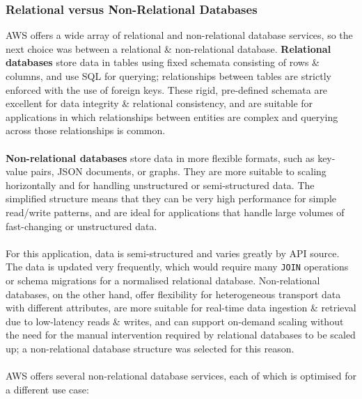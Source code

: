 \documentclass[a4paper,11pt]{report}
\begin{document}
\subsubsection{Relational versus Non-Relational Databases}
AWS offers a wide array of relational and non-relational database services, so the next choice was between a relational \& non-relational database.
\textbf{Relational databases} store data in tables using fixed schemata consisting of rows \& columns, and use SQL for querying;
relationships between tables are strictly enforced with the use of foreign keys.
These rigid, pre-defined schemata are excellent for data integrity \& relational consistency, and are suitable for applications in which relationships between entities are complex and querying across those relationships is common.
\\\\
\textbf{Non-relational databases} store data in more flexible formats, such as key-value pairs, JSON documents, or graphs.
They are more suitable to scaling horizontally and for handling unstructured or semi-structured data.
The simplified structure means that they can be very high performance for simple read/write patterns, and are ideal for applications that handle large volumes of fast-changing or unstructured data.
\\\\
For this application, data is semi-structured and varies greatly by API source.
The data is updated very frequently, which would require many \texttt{JOIN} operations or schema migrations for a normalised relational database.
Non-relational databases, on the other hand, offer flexibility for heterogeneous transport data with different attributes, are more suitable for real-time data ingestion \& retrieval due to low-latency reads \& writes, and can support on-demand scaling without the need for the manual intervention required by relational databases to be scaled up;
a non-relational database structure was selected for this reason.
\\\\
AWS offers several non-relational database services, each of which is optimised for a different use case\supercite{awsdatabases}:
\end{document}
